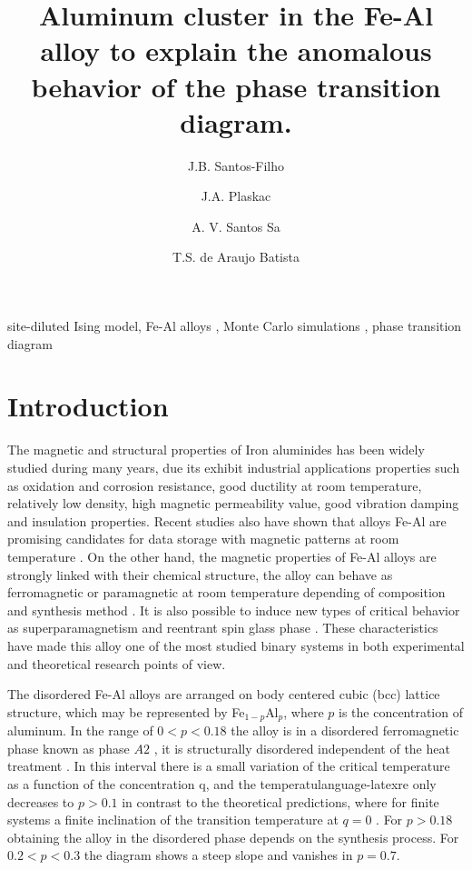 \documentclass[twocolumn,5p,12pt]{elsarticle}
\author[1]{J.B. Santos-Filho\corref{mycorrespondingauthor}}
\author[2]{J.A. Plaskac}
\author[1]{A. V. Santos Sa}
\author[3]{T.S. de Araujo Batista}
\begin{document}
\begin{frontmatter}

\title{Aluminum cluster in the Fe-Al alloy to explain the anomalous behavior of the phase transition diagram.}


\begin{abstract}
%
%
\end{abstract}

\begin{keyword}
site-diluted Ising model\sep
Fe-Al alloys  \sep
Monte Carlo simulations \sep
phase transition diagram
\end{keyword}
\end{frontmatter}


\section{Introduction}

The magnetic and structural properties of Iron aluminides has been widely studied during many years\cite{Domb1983, Kubaschewski1982}, due its exhibit industrial applications properties such as oxidation and corrosion resistance, good ductility at room temperature, relatively low density, high magnetic permeability value, good vibration damping and insulation properties. Recent studies also have shown that alloys Fe-Al are promising candidates for data storage with magnetic patterns at room temperature \cite{Menendez2009,Bali2014}.  On the other hand, the magnetic properties of Fe-Al alloys are strongly linked with their chemical structure, the alloy can behave as ferromagnetic or paramagnetic at room temperature   depending of composition and synthesis method \cite{Wolf11986,Besnus1975,Dias2009,Oubelkacem2010}. It is also possible to induce new types of critical behavior as superparamagnetism and reentrant spin glass phase \cite{Arrott1959,Shull1959,Boni1986,Takahashi1996}. These characteristics have made this alloy one of the most studied binary systems in both experimental and theoretical research points of view.

	The disordered Fe-Al alloys are arranged on body centered cubic (bcc)  lattice structure, which may be represented by Fe$_{1-p}$Al$_{p}$, where $p$ is the concentration of aluminum. In the range of $0 <p <0.18$ the alloy is in a disordered ferromagnetic phase known as phase $A2$ \cite{Sort2006,Trautvetter2011,Zamora2009}, it is structurally disordered independent of the heat treatment \cite{Kubaschewski1982}. In this interval there is a small variation of the critical temperature as a function of the concentration q, and the temperatulanguage-latexre only decreases to $p> 0.1$ in contrast to the theoretical predictions, where for finite systems a finite inclination of the transition temperature at $q = 0$ \cite{Domb1983}. For $p> 0.18$ obtaining the alloy in the disordered phase depends on the synthesis process. For $0.2<  p <0.3$ the diagram shows a steep slope and vanishes in  $p = 0.7$.
\end{document}
